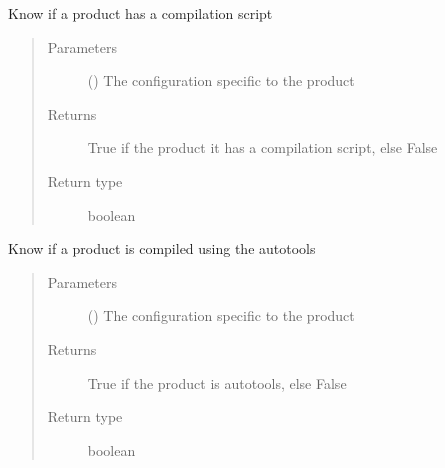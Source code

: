 \documentclass[a4paper,10pt,english]{sphinxmanual}
\begin{document}

\begin{fulllineitems}
\label{\detokenize{commands/apidoc/src:src.product.product_has_script}}
Know if a product has a compilation script
\begin{quote}\begin{description}
\item[{Parameters}] \leavevmode
{} () \textendash{} The configuration specific to 
the product

\item[{Returns}] \leavevmode
True if the product it has a compilation script, else False

\item[{Return type}] \leavevmode
boolean

\end{description}\end{quote}

\end{fulllineitems}


\begin{fulllineitems}
\label{\detokenize{commands/apidoc/src:src.product.product_is_autotools}}
Know if a product is compiled using the autotools
\begin{quote}\begin{description}
\item[{Parameters}] \leavevmode
{} () \textendash{} The configuration specific to 
the product

\item[{Returns}] \leavevmode
True if the product is autotools, else False

\item[{Return type}] \leavevmode
boolean

\end{description}\end{quote}

\end{fulllineitems}
\end{document}
